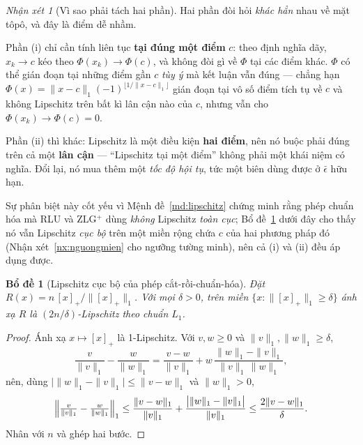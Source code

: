 \documentclass[11pt]{article}
\newtheorem{bode}[dinhly]{Bổ đề}
\theoremstyle{remark}
\newtheorem{nhanxet}[dinhly]{Nhận xét}
\newcommand{\pos}[1]{\left[#1\right]_+}
\begin{document}
\begin{nhanxet}[Vì sao phải tách hai phần]
Hai phần đòi hỏi \emph{khác hẳn} nhau về mặt tôpô, và đây là điểm dễ nhầm.

Phần (i) chỉ cần tính liên tục \textbf{tại đúng một điểm} $c$: theo định
nghĩa dãy, $x_k\to c$ kéo theo $\Phi(x_k)\to\Phi(c)$, và không đòi gì về
$\Phi$ tại các điểm khác. $\Phi$ có thể gián đoạn tại những điểm gần $c$
\emph{tùy ý} mà kết luận vẫn đúng --- chẳng hạn
$\Phi(x)=\|x-c\|_1(-1)^{\lfloor 1/\|x-c\|_1\rfloor}$ gián đoạn tại vô số
điểm tích tụ về $c$ và không Lipschitz trên bất kì lân cận nào của $c$,
nhưng vẫn cho $\Phi(x_k)\to\Phi(c)=0$.

Phần (ii) thì khác: Lipschitz là một điều kiện \textbf{hai điểm}, nên nó
buộc phải đúng trên cả một \textbf{lân cận} --- ``Lipschitz tại một điểm''
không phải một khái niệm có nghĩa. Đổi lại, nó mua thêm một \emph{tốc độ hội
tụ}, tức một biên dùng được ở $\bar\epsilon$ hữu hạn.

Sự phân biệt này cốt yếu vì Mệnh đề~\ref{md:lipschitz} chứng minh rằng phép
chuẩn hóa mà RLU và ZLG$^+$ dùng \emph{không} Lipschitz \emph{toàn cục};
Bổ đề~\ref{bd:lipcucbo} dưới đây cho thấy nó vẫn Lipschitz \emph{cục bộ}
trên một miền rộng chứa $c$ của hai phương pháp đó
(Nhận xét~\ref{nx:nguongmien} cho ngưỡng tường minh), nên cả (i) và (ii) đều
áp dụng được.
\end{nhanxet}

\begin{bode}[Lipschitz cục bộ của phép cắt-rồi-chuẩn-hóa]
\label{bd:lipcucbo}
Đặt $R(x) = n\,\pos{x}/\|\pos{x}\|_1$. Với mọi $\delta>0$, trên miền
$\{x : \|\pos{x}\|_1 \ge \delta\}$ ánh xạ $R$ là $(2n/\delta)$-Lipschitz theo
chuẩn $L_1$.
\end{bode}

\begin{proof}
Ánh xạ $x \mapsto \pos{x}$ là 1-Lipschitz. Với $v,w \ge 0$ và
$\|v\|_1,\|w\|_1 \ge \delta$,
\[
 \frac{v}{\|v\|_1} - \frac{w}{\|w\|_1}
 = \frac{v-w}{\|v\|_1} + w\,\frac{\|w\|_1-\|v\|_1}{\|v\|_1\,\|w\|_1},
\]
nên, dùng $\bigl|\|w\|_1-\|v\|_1\bigr| \le \|v-w\|_1$ và $\|w\|_1>0$,
\[
 \Bigl\|\tfrac{v}{\|v\|_1} - \tfrac{w}{\|w\|_1}\Bigr\|_1
 \le \frac{\|v-w\|_1}{\|v\|_1} + \frac{\bigl|\|w\|_1-\|v\|_1\bigr|}{\|v\|_1}
 \le \frac{2\|v-w\|_1}{\delta}.
\]
Nhân với $n$ và ghép hai bước.
\end{proof}
\end{document}

